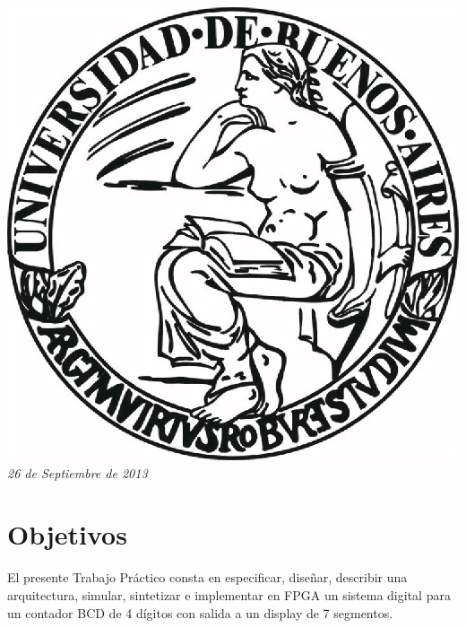 \documentclass{article}
\begin{document}
\begin{titlepage}
\includegraphics[scale=0.5]{UBA.jpg}\\[1cm] %


{\large \text \em {26 de Septiembre de 2013}}\\[3cm] %
 

\vfill %

\end{titlepage}

\tableofcontents
		
\newpage

\section{Objetivos}

El presente Trabajo Práctico consta en especificar, diseñar, describir una arquitectura, simular, sintetizar e implementar en FPGA un sistema digital para un contador BCD de 4 dígitos con salida a un display de 7 segmentos.
\end{document}

